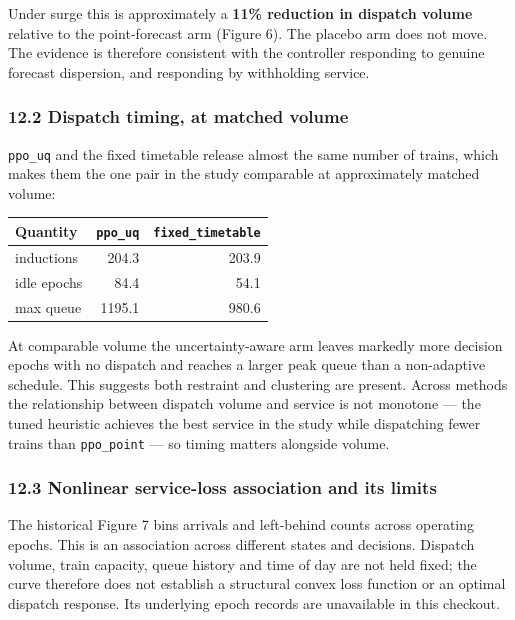 \documentclass[
]{article}
\begin{document}
Under surge this is approximately a \textbf{11\% reduction in dispatch
volume} relative to the point-forecast arm (Figure 6). The placebo arm
does not move. The evidence is therefore consistent with the controller
responding to genuine forecast dispersion, and responding by withholding
service.

\subsubsection{12.2 Dispatch timing, at matched
volume}\label{122-dispatch-timing-at-matched-volume}

\texttt{ppo\_uq} and the fixed timetable release almost the same number
of trains, which makes them the one pair in the study comparable at
approximately matched volume:

\begin{longtable}[]{@{}lrr@{}}
\toprule\noalign{}
Quantity & \texttt{ppo\_uq} & \texttt{fixed\_timetable} \\
\midrule\noalign{}
\endhead
\bottomrule\noalign{}
\endlastfoot
inductions & 204.3 & 203.9 \\
idle epochs & 84.4 & 54.1 \\
max queue & 1195.1 & 980.6 \\
\end{longtable}

At comparable volume the uncertainty-aware arm leaves markedly more
decision epochs with no dispatch and reaches a larger peak queue than a
non-adaptive schedule. This suggests both restraint and clustering are
present. Across methods the relationship between dispatch volume and
service is not monotone --- the tuned heuristic achieves the best
service in the study while dispatching fewer trains than
\texttt{ppo\_point} --- so timing matters alongside volume.

\subsubsection{12.3 Nonlinear service-loss association and its
limits}\label{123-nonlinear-service-loss-association-and-its-limits}

The historical Figure 7 bins arrivals and left-behind counts across
operating epochs. This is an association across different states and
decisions. Dispatch volume, train capacity, queue history and time of
day are not held fixed; the curve therefore does not establish a
structural convex loss function or an optimal dispatch response. Its
underlying epoch records are unavailable in this checkout.
\end{document}
